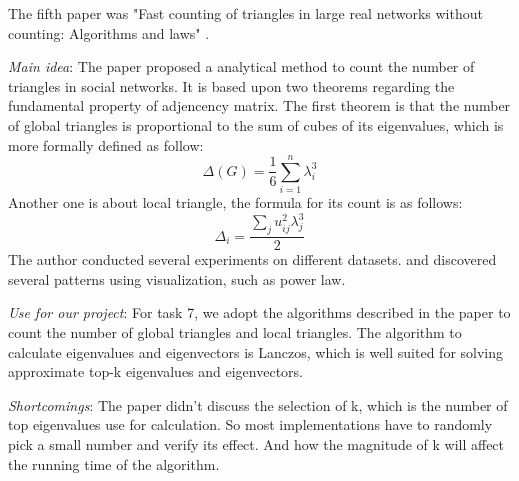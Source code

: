 The fifth paper was "Fast counting of triangles in large real networks without counting: Algorithms and laws" \cite{tsourakakis2008fast}.
\begin{itemize*}
\item {\em Main idea}: 
    The paper proposed a analytical method to count the number of triangles in social networks. It is based upon two theorems regarding the fundamental property of adjencency matrix. The first theorem is that the number of global triangles is proportional to the sum of cubes of its eigenvalues, which is more formally defined as follow: 
      \begin{equation}
      \Delta(G) = \frac{1}{6}\sum_{i=1}^{n} \lambda_{i}^{3}
      \end{equation}
    Another one is about local triangle, the formula for its count is as follows:
      \begin{equation}
      \Delta_{i} = \frac{\sum_{j} u_{ij}^{2} \lambda_{j}^{3}}{2}
      \end{equation}
    The author conducted several experiments on different datasets. and discovered several patterns using visualization, such as power law. 
\item {\em Use for our project}:
    For task 7, we adopt the algorithms described in the paper to count the number of global triangles and local triangles. The algorithm to calculate eigenvalues and eigenvectors is Lanczos, which is well suited for solving approximate top-k eigenvalues and eigenvectors.
\item {\em Shortcomings}:
    The paper didn't discuss the selection of k, which is the number of top eigenvalues use for calculation. So most implementations have to randomly pick a small number and verify its effect. And how the magnitude of k will affect the running time of the algorithm.
\end{itemize*}
